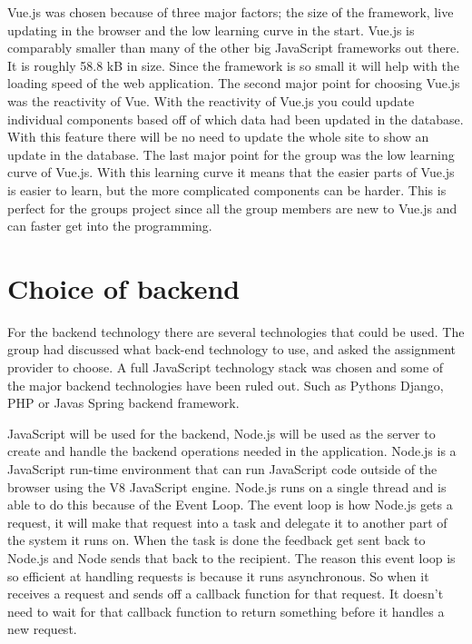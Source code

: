 Vue.js was chosen because of three major factors; the size of the framework, live updating in the browser and the low learning curve in the start. Vue.js is comparably smaller than many of the other big JavaScript frameworks out there. It is roughly 58.8 kB in size. Since the framework is so small it will help with the loading speed of the web application. The second major point for choosing Vue.js was the reactivity of Vue. With the reactivity of Vue.js you could update individual components based off of which data had been updated in the database. With this feature there will be no need to update the whole site to show an update in the database. The last major point for the group was the low learning curve of Vue.js. With this learning curve it means that the easier parts of Vue.js is easier to learn, but the more complicated components can be harder. This is perfect for the groups project since all the group members are new to Vue.js and can faster get into the programming.

\section{Choice of backend}
For the backend technology there are several technologies that could be used. The group had discussed what back-end technology to use, and asked the assignment provider to choose. A full JavaScript technology stack was chosen and some of the major backend technologies have been ruled out. Such as Pythons Django, PHP or Javas Spring backend framework. 

JavaScript will be used for the backend, Node.js will be used as the server to create and handle the backend operations needed in the application. Node.js is a JavaScript run-time environment that can run JavaScript code outside of the browser using the V8 JavaScript engine. Node.js runs on a single thread and is able to do this because of the Event Loop. The event loop is how Node.js gets a request, it will make that request into a task and delegate it to another part of the system it runs on. When the task is done the feedback get sent back to Node.js and Node sends that back to the recipient. The reason this event loop is so efficient at handling requests is because it runs asynchronous. So when it receives a request and sends off a callback function for that request. It doesn't need to wait for that callback function to return something before it handles a new request.

